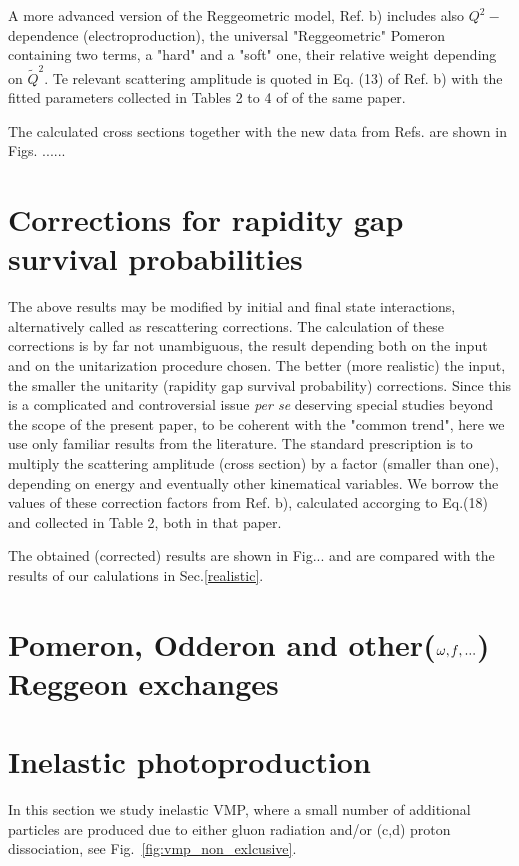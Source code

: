 \documentclass[12pt]{article}
\begin{document}
A more advanced version of the Reggeometric model, Ref. \cite{Fazio}b) includes also $Q^2-$ dependence (electroproduction), the universal "Reggeometric" Pomeron containing two terms, a "hard" and a "soft" one, their relative weight depending on $\tilde Q^2$. Te relevant scattering amplitude is quoted in Eq. (13) of Ref. \cite{Fazio}b) with the fitted parameters collected in Tables 2 to 4 of of the same paper.

The calculated cross sections together with the new data from Refs. \cite{LHCb1, LHCb2} are shown in Figs. ......

\section{Corrections for rapidity gap survival probabilities}\label{corrections}
The above results may be modified by initial and final state interactions,
alternatively called as rescattering corrections. The calculation of these
corrections is by far not unambiguous, the result depending both on the input 
and on the unitarization procedure chosen. The better (more realistic) the input, the smaller the unitarity (rapidity gap survival probability) corrections. 
Since this is a complicated and controversial issue {\it per se} deserving special studies beyond the scope of the present paper, to be coherent with the "common trend", here we use only familiar results from the literature. The standard prescription is to multiply the scattering amplitude (cross section) by a factor (smaller than one), depending on energy and eventually other kinematical variables. 
We borrow the values of these correction factors from Ref.\cite{Ryskin} b), calculated accorging to Eq.(18) and collected in Table 2, both in that paper.

The obtained (corrected) results are shown in Fig... and are compared with the results of our calulations in Sec.\ref{realistic}.

\section{Pomeron, Odderon and other($\omega, {\it f},...$) Reggeon exchanges}\label{Reggeons}

\section{Inelastic photoproduction} 
In this section we study inelastic VMP, where a small number of additional particles are produced due to either gluon radiation and/or (c,d) proton dissociation, see Fig.~\ref{fig:vmp_non_exlcusive}.
\end{document}
